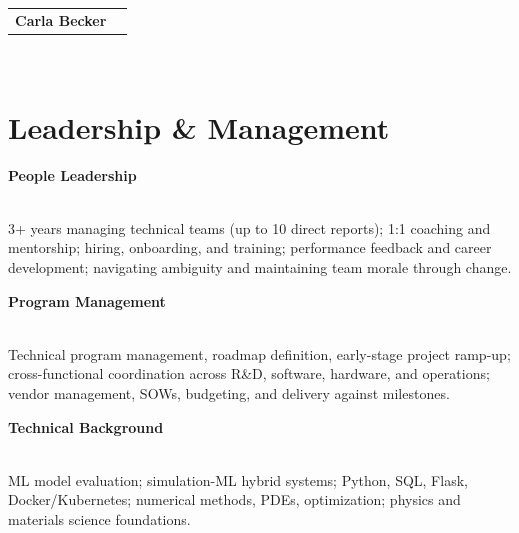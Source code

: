 \documentclass[letterpaper,10.8pt]{article}
\newcommand{\resumeSubHeadingListStart}{\begin{itemize}[leftmargin=*]}
\newcommand{\resumeSubHeadingListEnd}{\end{itemize}}
\begin{document}
\begin{tabular*}{\textwidth}{l@{\extracolsep{\fill}}r}
\textbf{{\LARGE Carla Becker}} & \end{tabular*} \\
\vspace{1mm}

\vspace{-5mm}
\begin{minipage}[t]{0.62\textwidth}
\vspace{4pt}
\noindent
\section{Leadership \& Management}
\resumeSubHeadingListStart

{\vspace{2pt}\item \textbf{People Leadership}} \\
{\small 3+ years managing technical teams (up to 10 direct reports); 1:1 coaching and mentorship; hiring, onboarding, and training; performance feedback and career development; navigating ambiguity and maintaining team morale through change.}  

{\vspace{-2pt}\item \textbf{Program Management}} \\
{\small Technical program management, roadmap definition, early-stage project ramp-up; cross-functional coordination across R\&D, software, hardware, and operations; vendor management, SOWs, budgeting, and delivery against milestones.}  

{\vspace{-2pt}\item \textbf{Technical Background}} \\
{\small ML model evaluation; simulation-ML hybrid systems; Python, SQL, Flask, Docker/Kubernetes; numerical methods, PDEs, optimization; physics and materials science foundations.}

\resumeSubHeadingListEnd
\end{minipage}\hfill%
\end{document}
